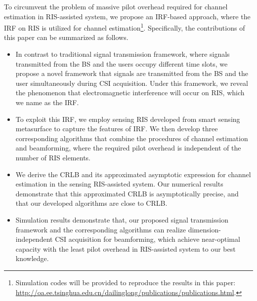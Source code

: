 \documentclass[12pt,draftclsnofoot,journal,onecolumn]{IEEEtran}
\theoremstyle{nonumberplain}
\begin{document}
To circumvent the problem of massive pilot overhead required for channel estimation in RIS-assisted system, we propose an \ac{IRF}-based approach, where the \ac{IRF} on RIS is utilized for channel estimation\footnote{Simulation codes will be provided to reproduce the results in this paper: \url{http://oa.ee.tsinghua.edu.cn/dailinglong/publications/publications.html}.}.
Specifically, the contributions of this paper can be summarized as follows.
    \begin{itemize}
        \item %
        In contrast to traditional signal transmission framework, where signals transmitted from the \ac{BS} and the users occupy different time slots, we propose a novel framework that signals are transmitted from the \ac{BS} and the user simultaneously during CSI acquisition.
        Under this framework, we reveal the phenomenon that electromagnetic interference will occur on RIS, which we name as the \ac{IRF}.
        \item
        To exploit this \ac{IRF}, we employ sensing RIS developed from smart sensing metasurface \cite{ma2020smartsensing} to capture the features of \ac{IRF}.
        We then develop three corresponding algorithms that combine the procedures of channel estimation and beamforming, where the required pilot overhead is independent of the number of RIS elements.
        \item
        We derive the \ac{CRLB} and its approximated asymptotic expression for channel estimation in the sensing RIS-assisted system.
        Our numerical results demonstrate that this approximated \ac{CRLB} is asymptotically precise, and that our developed algorithms are close to \ac{CRLB}.
        \item
        Simulation results demonstrate that, our proposed signal transmission framework and the corresponding algorithms can realize dimension-independent CSI acquisition for beamforming, which achieve near-optimal capacity with the least pilot overhead in RIS-assisted system to our best knowledge.

\end{itemize}
\end{document}
